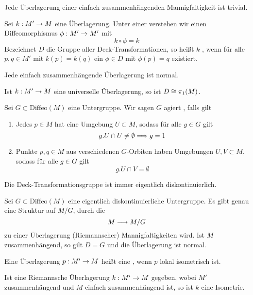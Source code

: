 \documentclass{book}
\begin{document}
\Kor{}
Jede Überlagerung einer einfach zusammenhängenden Mannigfaltigkeit ist trivial.

\Def{}
Sei $k : M' \overset{}{\rightarrow} M$ eine Überlagerung. Unter einer  verstehen wir einen Diffeomorphismus $\phi : M' \overset{}{\rightarrow} M'$ mit
\[ k \circ \phi = k \]
Bezeichnet $D$ die Gruppe aller Deck-Transformationen, so heißt $k$ , wenn für alle $p,q \in M'$ mit $k(p) = k(q)$ ein $\phi \in D$ mit $\phi(p) = q$ existiert.

\Kor{}
Jede einfach zusammenhängende Überlagerung ist normal.

\Satz{}
Ist $k: M' \overset{}{\rightarrow} M$ eine universelle Überlagerung, so ist $D \overset{}{\cong} \pi_1(M)$.

\Def{}
Sei $G \subset \text{Diffeo}(M)$ eine Untergruppe. Wir sagen $G$ agiert , falls gilt
\begin{enumerate}[PD1)]
\item Jedes $p \in M$ hat eine Umgebung $U \subset M$, sodass für alle $g \in G$ gilt
\[ g.U \cap U \neq \emptyset \overset{}{\Longrightarrow} g = 1 \]
\item Punkte $p,q \in M$ aus verschiedenen $G$-Orbiten haben Umgebungen $U,V\subset M$, sodass für alle $g \in G$ gilt
\[ g.U \cap V = \emptyset \]
\end{enumerate}

\Bem{}
Die Deck-Transformationsgruppe ist immer eigentlich diskontinuierlich.

\Lem{}
Sei $G \subset \text{Diffeo}(M)$ eine eigentlich diskontinuierliche Untergruppe. Es gibt genau eine Struktur auf $M/G$, durch die
\[ M \overset{}{\longrightarrow} M/G\]
zu einer Überlagerung (Riemannscher) Mannigfaltigkeiten wird. Ist $M$ zusammenhängend, so gilt $D = G$ und die Überlagerung ist normal.

\Def{}
Eine Überlagerung $p : M' \overset{}{\rightarrow} M$ heißt eine , wenn $p$ lokal isometrisch ist.

\Kor{}
Ist eine Riemannsche Überlagerung $k:M' \overset{}{\rightarrow} M$ gegeben, wobei $M'$ zusammenhängend und $M$ einfach zusammenhängend ist, so ist $k$ eine Isometrie.
\end{document}
